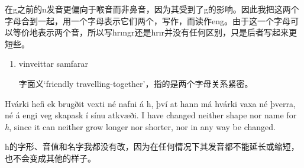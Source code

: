 \begin{translation*}{}
  在g之前的n发音更偏向于喉音而非鼻音，因为其受到了g的影响。因此我把这两个字母合到一起，用一个字母表示它们两个，写作\textcrg ，而读作eng。由于这一个字母可以等价地表示两个音，所以写hrıngr还是hrı\textcrg r并没有任何区别，只是后者写起来更短些。
\end{translation*}
\begin{grammar*}{}
  \begin{enumerate}[leftmargin=*]
    \item vinveittar samfarar

          字面义`friendly travelling-together'，指的是两个字母关系紧密。
  \end{enumerate}
\end{grammar*}
\begin{paracol}{2}
  Hvárki hefi ek brugðit vexti né nafni á h, því at hann má hvárki vaxa né þverra, né á engi veg skapask í sínu atkvæði.
  \switchcolumn
  I have changed neither shape nor name for \textit{h}, since it can neither grow longer nor shorter, nor in any way be changed.
\end{paracol}
\begin{translation*}{}
  h的字形、音值和名字我都没有改，因为在任何情况下其发音都不能延长或缩短，也不会变成其他的样子。
\end{translation*}

